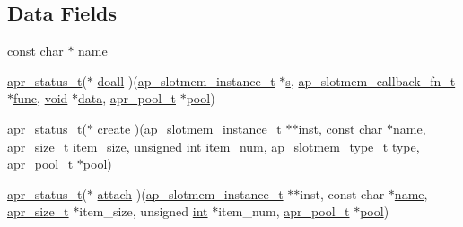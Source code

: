 \subsection*{Data Fields}
\begin{DoxyCompactItemize}
\item 
const char $\ast$ \hyperlink{structap__slotmem__provider__t_af16641b9117b0181ea1224515dd15b73}{name}
\item 
\hyperlink{group__apr__errno_gaa5105fa83cc322f09382292db8b47593}{apr\+\_\+status\+\_\+t}($\ast$ \hyperlink{structap__slotmem__provider__t_acd9743ee251206018c6085ed26745447}{doall} )(\hyperlink{structap__slotmem__instance__t}{ap\+\_\+slotmem\+\_\+instance\+\_\+t} $\ast$\hyperlink{pcretest_8txt_a062597889ba244b72877454b1d3adecf}{s}, \hyperlink{group__MEM_gafbda0dd8b28735f3b902250213c3c506}{ap\+\_\+slotmem\+\_\+callback\+\_\+fn\+\_\+t} $\ast$\hyperlink{group__apr__thread__proc_ga40bf04c29bfb67c93dc7dc5075531285}{func}, \hyperlink{group__MOD__ISAPI_gacd6cdbf73df3d9eed42fa493d9b621a6}{void} $\ast$\hyperlink{structdata}{data}, \hyperlink{structapr__pool__t}{apr\+\_\+pool\+\_\+t} $\ast$\hyperlink{group__APR__XLATE_gabb3cd978f04c73d0b763c391e9bfde73}{pool})
\item 
\hyperlink{group__apr__errno_gaa5105fa83cc322f09382292db8b47593}{apr\+\_\+status\+\_\+t}($\ast$ \hyperlink{structap__slotmem__provider__t_aa4ab8c2b0c68f4bed993b36e1c81b9c9}{create} )(\hyperlink{structap__slotmem__instance__t}{ap\+\_\+slotmem\+\_\+instance\+\_\+t} $\ast$$\ast$inst, const char $\ast$\hyperlink{structap__slotmem__provider__t_af16641b9117b0181ea1224515dd15b73}{name}, \hyperlink{group__apr__platform_gaaa72b2253f6f3032cefea5712a27540e}{apr\+\_\+size\+\_\+t} item\+\_\+size, unsigned \hyperlink{pcre_8txt_a42dfa4ff673c82d8efe7144098fbc198}{int} item\+\_\+num, \hyperlink{group__MEM_ga2e647f79e68a1f0e6e733ec197c03bcc}{ap\+\_\+slotmem\+\_\+type\+\_\+t} \hyperlink{pcre_8txt_a2463fbbe8b0c90b90db12195e1edaa5d}{type}, \hyperlink{structapr__pool__t}{apr\+\_\+pool\+\_\+t} $\ast$\hyperlink{group__APR__XLATE_gabb3cd978f04c73d0b763c391e9bfde73}{pool})
\item 
\hyperlink{group__apr__errno_gaa5105fa83cc322f09382292db8b47593}{apr\+\_\+status\+\_\+t}($\ast$ \hyperlink{structap__slotmem__provider__t_a91c1508085db06067830fe5ddf65cdba}{attach} )(\hyperlink{structap__slotmem__instance__t}{ap\+\_\+slotmem\+\_\+instance\+\_\+t} $\ast$$\ast$inst, const char $\ast$\hyperlink{structap__slotmem__provider__t_af16641b9117b0181ea1224515dd15b73}{name}, \hyperlink{group__apr__platform_gaaa72b2253f6f3032cefea5712a27540e}{apr\+\_\+size\+\_\+t} $\ast$item\+\_\+size, unsigned \hyperlink{pcre_8txt_a42dfa4ff673c82d8efe7144098fbc198}{int} $\ast$item\+\_\+num, \hyperlink{structapr__pool__t}{apr\+\_\+pool\+\_\+t} $\ast$\hyperlink{group__APR__XLATE_gabb3cd978f04c73d0b763c391e9bfde73}{pool})

\end{DoxyCompactItemize}
